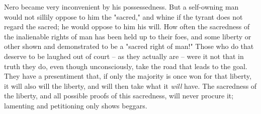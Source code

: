 Nero became very inconvenient by his possessedness. But a self-owning man 
would not sillily oppose to him the "{}sacred,"{} and whine if the tyrant does 
not regard the sacred; he would oppose to him his will. How often the 
sacredness of the inalienable rights of man has been held up to their foes, 
and some liberty or other shown and demonstrated to be a "{}sacred right of 
man!"{} Those who do that deserve to be laughed out of court -- as they 
actually are -- were it not that in truth they do, even though unconsciously, 
take the road that leads to the goal. They have a presentiment that, if only 
the majority is once won for that liberty, it will also will the liberty, and 
will then take what it \textit{will} have. The sacredness of the liberty, and 
all possible proofs of this sacredness, will never procure it; lamenting and 
petitioning only shows beggars.

